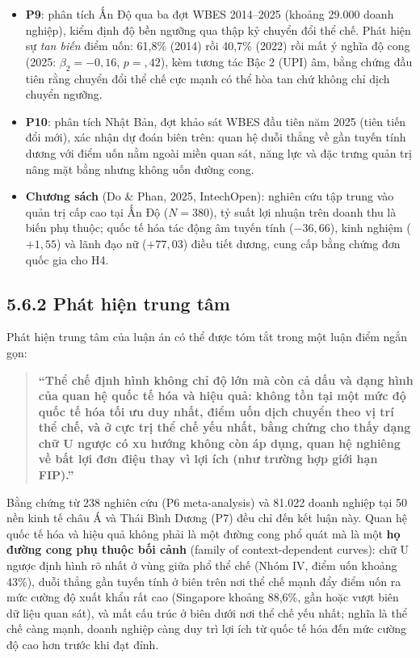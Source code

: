 \documentclass[
  a4paper,
  13pt]{extreport}
\begin{document}
\begin{itemize}
  hạn chế ba cụm và mang tính minh họa, nhạy cảm với phiên bản dữ liệu
  (xem Mục 4.7.8).
\item
  \textbf{P9}: phân tích Ấn Độ qua ba đợt WBES 2014--2025 (khoảng 29.000
  doanh nghiệp), kiểm định độ bền ngưỡng qua thập kỷ chuyển đổi thể chế.
  Phát hiện sự \emph{tan biến} điểm uốn: 61,8\% (2014) rồi 40,7\% (2022)
  rồi mất ý nghĩa độ cong (2025: \(\beta_2 = -0{,}16\), \(p = {,}42\)),
  kèm tương tác Bậc 2 (UPI) âm, bằng chứng đầu tiên rằng chuyển đổi thể
  chế cực mạnh có thể hòa tan chứ không chỉ dịch chuyển ngưỡng.
\item
  \textbf{P10}: phân tích Nhật Bản, đợt khảo sát WBES đầu tiên năm 2025
  (tiên tiến đổi mới), xác nhận dự đoán biên trên: quan hệ duỗi thẳng về
  gần tuyến tính dương với điểm uốn nằm ngoài miền quan sát, năng lực và
  đặc trưng quản trị nâng mặt bằng nhưng không uốn đường cong.
\item
  \textbf{Chương sách} (Do \& Phan, 2025, IntechOpen): nghiên cứu tập
  trung vào quản trị cấp cao tại Ấn Độ (\(N = 380\)), tỷ suất lợi nhuận
  trên doanh thu là biến phụ thuộc; quốc tế hóa tác động âm tuyến tính
  (\(-36{,}66\)), kinh nghiệm (\(+1{,}55\)) và lãnh đạo nữ
  (\(+77{,}03\)) điều tiết dương, cung cấp bằng chứng đơn quốc gia cho
  H4.
\end{itemize}

\hypertarget{phuxe1t-hiux1ec7n-trung-tuxe2m}{%
\subsection{5.6.2 Phát hiện trung
tâm}\label{phuxe1t-hiux1ec7n-trung-tuxe2m}}

Phát hiện trung tâm của luận án có thể được tóm tắt trong một luận điểm
ngắn gọn:

\begin{quote}
\textbf{``Thể chế định hình không chỉ độ lớn mà còn cả dấu và dạng hình
của quan hệ quốc tế hóa và hiệu quả: không tồn tại một mức độ quốc tế
hóa tối ưu duy nhất, điểm uốn dịch chuyển theo vị trí thể chế, và ở cực
trị thể chế yếu nhất, bằng chứng cho thấy dạng chữ U ngược có xu hướng
không còn áp dụng, quan hệ nghiêng về bất lợi đơn điệu thay vì lợi ích
(như trường hợp giới hạn FIP).''}
\end{quote}

Bằng chứng từ 238 nghiên cứu (P6 meta-analysis) và 81.022 doanh nghiệp
tại 50 nền kinh tế châu Á và Thái Bình Dương (P7) đều chỉ đến kết luận
này. Quan hệ quốc tế hóa và hiệu quả không phải là một đường cong phổ
quát mà là một \textbf{họ đường cong phụ thuộc bối cảnh} (family of
context-dependent curves): chữ U ngược định hình rõ nhất ở vùng giữa phổ
thể chế (Nhóm IV, điểm uốn khoảng 43\%), duỗi thẳng gần tuyến tính ở
biên trên nơi thể chế mạnh đẩy điểm uốn ra mức cường độ xuất khẩu rất
cao (Singapore khoảng 88,6\%, gần hoặc vượt biên dữ liệu quan sát), và
mất cấu trúc ở biên dưới nơi thể chế yếu nhất; nghĩa là thể chế càng
mạnh, doanh nghiệp càng duy trì lợi ích từ quốc tế hóa đến mức cường độ
cao hơn trước khi đạt đỉnh.
\end{document}
